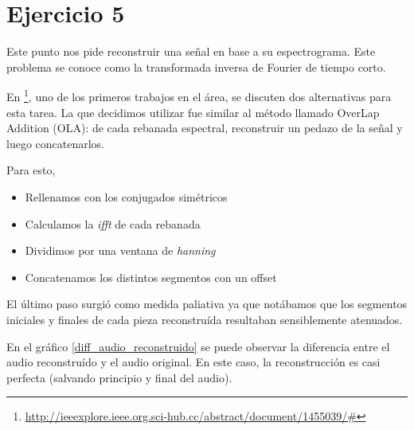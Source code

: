 \documentclass[paper=a4, fontsize=11pt]{scrartcl} %
\numberwithin{equation}{section} %
\numberwithin{figure}{section} %
\numberwithin{table}{section} %
\begin{document}
\section{Ejercicio 5}

Este punto nos pide reconstruir una señal en base a su espectrograma. Este problema se conoce como la transformada inversa de Fourier de tiempo corto.

En \footnote{\url{http://ieeexplore.ieee.org.sci-hub.cc/abstract/document/1455039/#}}, uno de los primeros trabajos en el área, se discuten dos alternativas para esta tarea. La que decidimos utilizar fue similar al método llamado OverLap Addition (OLA): de cada rebanada espectral, reconstruir un pedazo de la señal y luego concatenarlos.

Para esto,

\begin{itemize}
    \item Rellenamos con los conjugados simétricos
    \item Calculamos la \emph{ifft} de cada rebanada
    \item Dividimos por una ventana de \emph{hanning}
    \item Concatenamos los distintos segmentos con un offset
\end{itemize}

El último paso surgió como medida paliativa ya que notábamos que los segmentos iniciales y finales de cada pieza reconstruída resultaban sensiblemente atenuados.

En el gráfico \ref{diff_audio_reconstruido} se puede observar la diferencia entre el audio reconstruído y el audio original. En este caso, la reconstrucción es casi perfecta (salvando principio y final del audio).
\end{document}
